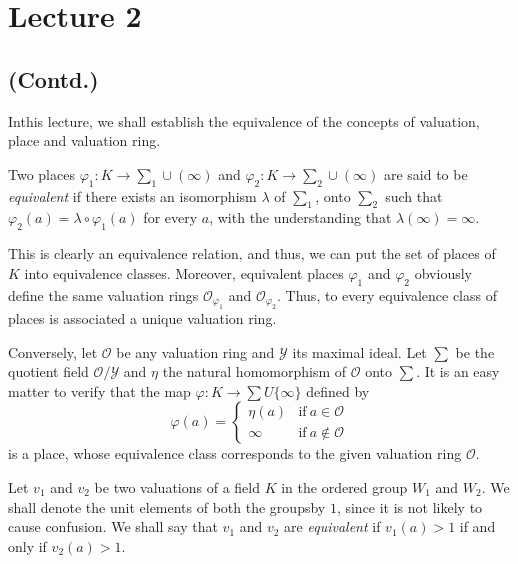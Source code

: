 \chapter{Lecture 2}\label{chap2}

\setcounter{section}{2}\label{chap2:sec3}
\section{(Contd.)}

In\pageoriginale this lecture, we shall establish the equivalence of the concepts of
valuation, place and valuation ring. 

Two places $\varphi_1 : K \rightarrow \sum_1 \cup (\infty)$ and
$\varphi_2 : K \rightarrow \sum_2 \cup (\infty)$ are said to be
\textit{equivalent} if there exists an isomorphism $\lambda$ of $\sum_1$,
onto $\sum_2$ such that $\varphi_2 (a) = \lambda \circ \varphi_1 (a)$ for
every $a$, with the understanding that $\lambda(\infty) = \infty$. 

This is clearly an equivalence relation, and thus, we can put the set
of places of $K$ into equivalence classes. Moreover, equivalent places
$\varphi_1$ and $\varphi_2$ obviously define the same valuation rings
$\mathscr{O}_{\varphi_1}$ and $\mathscr{O}_{\varphi_2}$. Thus, to
every equivalence class of places is associated a unique valuation
ring. 

Conversely, let $\mathscr{O}$ be any valuation ring and $\mathscr{Y}$
its maximal ideal. Let $\sum$ be the quotient field $\mathscr{O}/
\mathscr{Y}$ and $\eta$ the natural homomorphism of $\mathscr{O}$ onto
$\sum$. It is an easy matter to verify that the map $\varphi : K
\rightarrow \sum U \{\infty \}$ defined by 
\begin{equation*}
  \varphi(a) =
  \begin{cases}
    \eta (a) & \text{if}~ a  \in \mathscr{O} \\ 
    \infty & \text{if}~ a \notin \mathscr{O}
  \end{cases}
\end{equation*}
is a place, whose equivalence class corresponds to the given valuation
ring $\mathscr{O}$. 

Let $v_1$ and $v_2$ be two valuations of a field $K$ in the ordered
group $W_1$ and $W_2$. We shall denote the unit elements of both the
groups\pageoriginale by $1$, since it is not likely to cause confusion. We shall say
that $v_1$ and $v_2$ are \textit{equivalent} if $v_1 (a) > 1$ if and
only if $v_2(a) > 1$. 

